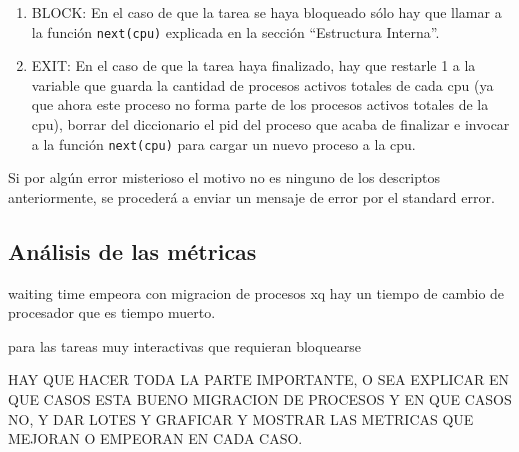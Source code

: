 \begin{itemize}
\begin{enumerate}
		\item BLOCK: En el caso de que la tarea se haya bloqueado s\'olo hay que llamar a la funci\'on \texttt{next(cpu)} explicada en la secci\'on ``Estructura Interna''.
		\item EXIT: En el caso de que la tarea haya finalizado, hay que restarle 1 a la variable que guarda la cantidad de procesos activos totales de cada cpu (ya que ahora este proceso no forma parte de los procesos activos totales de la cpu), borrar del diccionario el pid del proceso que acaba de finalizar e invocar a la funci\'on \texttt{next(cpu)} para cargar un nuevo proceso a la cpu.
	\end{enumerate}
	Si por alg\'un error misterioso el motivo no es ninguno de los descriptos anteriormente, se proceder\'a a enviar un mensaje de error por el standard error.
\end{itemize}

\subsection{An\'alisis de las m\'etricas}

waiting time empeora con migracion de procesos xq hay un tiempo de cambio de procesador que es tiempo muerto.

para las tareas muy interactivas que requieran bloquearse 


HAY QUE HACER TODA LA PARTE IMPORTANTE, O SEA EXPLICAR EN QUE CASOS ESTA BUENO  MIGRACION DE PROCESOS Y EN QUE CASOS NO, Y DAR LOTES Y GRAFICAR Y MOSTRAR LAS METRICAS QUE MEJORAN O EMPEORAN EN CADA CASO.














